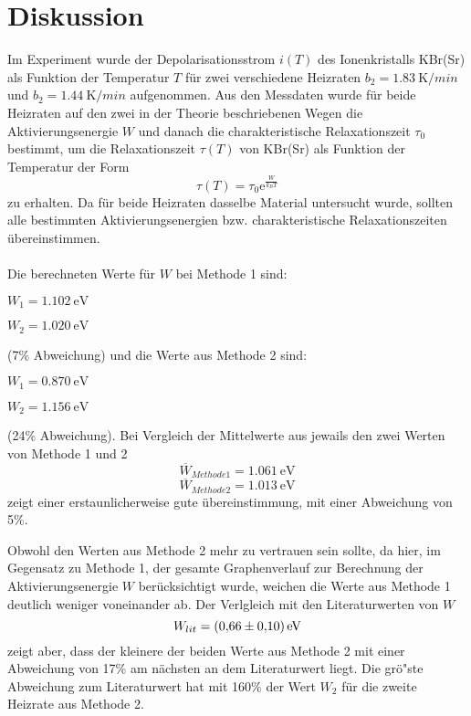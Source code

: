 \section{Diskussion}
\label{sec:Diskussion}
  Im Experiment wurde der Depolarisationsstrom $i(T)$ des Ionenkristalls KBr(Sr) als Funktion der Temperatur $T$ für zwei verschiedene Heizraten $b_2=\SI{1,83}{\kelvin}/\si{min}$ und $b_2=\SI{1,44}{\kelvin}/\si{min}$ aufgenommen.
  Aus den Messdaten wurde für beide Heizraten auf den zwei in der Theorie beschriebenen Wegen die Aktivierungsenergie $W$ und danach die charakteristische Relaxationszeit $\tau_0$ bestimmt, um die Relaxationszeit $\tau(T)$ von KBr(Sr) als Funktion der Temperatur der Form
  \begin{equation}
    \tau(T)=\tau_0\text{e}^{\frac{W}{k_BT}}
  \end{equation}
  zu erhalten.
  Da für beide Heizraten dasselbe Material untersucht wurde, sollten alle bestimmten Aktivierungsenergien bzw. charakteristische Relaxationszeiten übereinstimmen.\\
  \\ Die berechneten Werte für $W$ bei Methode 1 sind:
   \begin{center}
  $W_1=\SI{1,102}{\electronvolt}$
  \end{center}

   \begin{center}
  $W_2=\SI{1,020}{\electronvolt}$
  \end{center}
  (7\% Abweichung) und die Werte aus Methode 2 sind:
  \begin{center}
  $W_1=\SI{0,870}{\electronvolt}$
  \end{center}

  \begin{center}
  $W_2=\SI{1,156}{\electronvolt}$
  \end{center}
  (24\% Abweichung).
  Bei Vergleich der Mittelwerte aus jewails den zwei Werten von Methode 1 und 2
  \begin{equation}
    \overline{W}_{Methode1}=\SI{1,061}{\electronvolt}
  \end{equation}
  \begin{equation}
    \overline{W}_{Methode2}=\SI{1,013}{\electronvolt}
  \end{equation}
  zeigt einer erstaunlicherweise gute übereinstimmung, mit einer Abweichung von 5\%.

  Obwohl den Werten aus Methode 2 mehr zu vertrauen sein sollte, da hier, im Gegensatz zu Methode 1, der gesamte Graphenverlauf zur Berechnung der Aktivierungsenergie $W$ berücksichtigt wurde, weichen die Werte aus Methode 1 deutlich weniger voneinander ab.
  Der Verlgleich mit den Literaturwerten von $W$
  \begin{equation}
    W_{lit}=\SI{0,66 \pm 0,1}{\electronvolt}
  \end{equation}
  zeigt aber, dass der kleinere der beiden Werte aus Methode 2 mit einer Abweichung von 17\% am nächsten an dem Literaturwert liegt.
  Die grö"ste Abweichung zum Literaturwert hat mit 160\% der Wert $W_2$ für die zweite Heizrate aus Methode 2.


